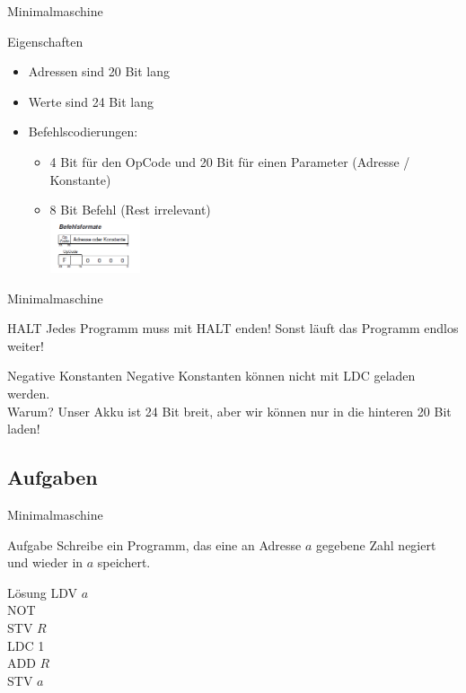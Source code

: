 \begin{frame}{Minimalmaschine}
	\begin{exampleblock}{Eigenschaften}
		\begin{itemize}
		\item Adressen sind 20 Bit lang
		\item Werte sind 24 Bit lang
		\item Befehlscodierungen:
		\begin{itemize}
			\item 4 Bit für den OpCode und 20 Bit für einen Parameter (Adresse / Konstante)
			\item 8 Bit Befehl (Rest irrelevant)\\
			\includegraphics[width=100px]{MIMA_commands.png}\\
		\end{itemize} 
	\end{itemize}
	\end{exampleblock}
\end{frame}

\begin{frame}{Minimalmaschine}
	\begin{alertblock}{HALT}
		Jedes Programm muss mit HALT enden! Sonst läuft das Programm endlos weiter!
	\end{alertblock}

	\begin{alertblock}{Negative Konstanten}
		Negative Konstanten können nicht mit LDC geladen werden.\\
		Warum? \pause Unser Akku ist 24 Bit breit, aber wir können nur in die hinteren 20 Bit laden!
	\end{alertblock}
\end{frame}

\subsection{Aufgaben}
\begin{frame}{Minimalmaschine}
	\begin{exampleblock}{Aufgabe}
		Schreibe ein Programm, das eine an Adresse $a$ gegebene Zahl negiert und wieder in $a$ speichert.
	\end{exampleblock}
	\pause
	\begin{block}{Lösung}
			LDV $a$\\
			NOT\\
			STV $R$\\
			LDC 1\\
			ADD $R$\\
			STV $a$
		\end{block}
\end{frame}

